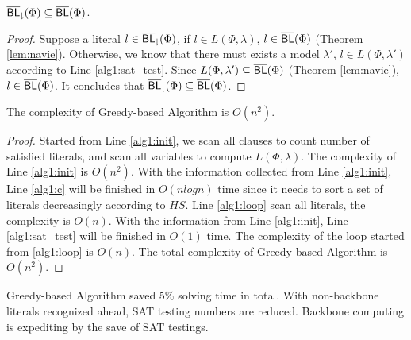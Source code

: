 \begin{theorem}
${\sf \overline{BL}_\downharpoonright}(\Phi)\subseteq\overline{\textsf{BL}}(\Phi)$.
\end{theorem}

\begin{proof}
Suppose a literal $l\in{\sf \overline{BL}_\downharpoonright}(\Phi)$, if $l\in L(\Phi,\lambda)$, $l\in\overline{\textsf{BL}}(\Phi)$ (Theorem \ref{lem:navie}). Otherwise, we know that there must exists a model $\lambda'$, $l\in L(\Phi,\lambda')$ according to Line \ref{alg1:sat_test}. Since $L(\Phi,\lambda')\subseteq\overline{\textsf{BL}}(\Phi)$ (Theorem \ref{lem:navie}), $l\in\overline{\textsf{BL}}(\Phi)$. It concludes that ${\sf \overline{BL}_\downharpoonright}(\Phi)\subseteq\overline{\textsf{BL}}(\Phi)$.
\end{proof}

\begin{theorem}
The complexity of Greedy-based Algorithm is $O(n^2)$.
\end{theorem}

\begin{proof}
Started from Line \ref{alg1:init}, we scan all clauses to count number of satisfied literals, and scan all variables to compute $L(\Phi,\lambda)$. The complexity of Line \ref{alg1:init} is $O(n^2)$. With the information collected from Line \ref{alg1:init}, Line \ref{alg1:c} will be finished in $O(nlogn)$ time since it needs to sort a set of literals decreasingly according to $HS$.  Line \ref{alg1:loop} scan all literals, the complexity is $O(n)$. With the information from Line \ref{alg1:init}, Line \ref{alg1:sat_test} will be finished in $O(1)$ time. The complexity of the loop started from \ref{alg1:loop} is $O(n)$. The total complexity of Greedy-based Algorithm is $O(n^2)$.
\end{proof}

Greedy-based Algorithm saved 5\% solving time in total. With non-backbone literals recognized ahead, SAT testing numbers are reduced. Backbone computing is expediting by the save of SAT testings.
